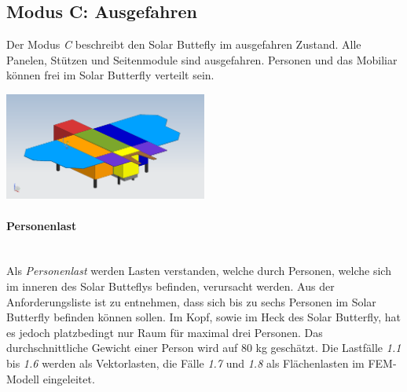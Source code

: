 
\subsection{Modus C: Ausgefahren}
Der Modus \emph{C} beschreibt den Solar Buttefly im ausgefahren Zustand. Alle Panelen, Stützen und Seitenmodule sind ausgefahren. Personen und das Mobiliar können frei im Solar Butterfly verteilt sein.\\

\begin{center}
  \includegraphics[width=0.5\textwidth]{04_Figures/C.png}
  \label{Modus C}
\end{center}

\paragraph{Personenlast}\mbox{}\\
Als \emph{Personenlast} werden Lasten verstanden, welche durch Personen, welche sich im inneren des Solar Butteflys befinden, verursacht werden. Aus der Anforderungsliste ist zu entnehmen, dass sich bis zu sechs Personen im Solar Butterfly befinden können sollen. Im Kopf, sowie im Heck des Solar Butterfly, hat es jedoch platzbedingt nur Raum für maximal drei Personen. Das durchschnittliche Gewicht einer Person wird auf 80 kg geschätzt. Die Lastfälle \emph{1.1} bis \emph{1.6} werden als Vektorlasten, die Fälle \emph{1.7} und \emph{1.8} als Flächenlasten im FEM-Modell eingeleitet.


